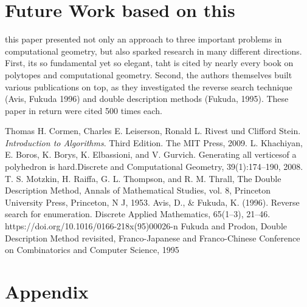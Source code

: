 \documentclass[a4paper, 11pt]{article}
\begin{document}
\section{Future Work based on this }

this paper presented not only an approach to three important problems in computational geometry, but also sparked research in many different directions. First, its so fundamental yet so elegant, taht is cited by nearly every book on polytopes and computational geometry. Second, the authors themselves built various publications on top, as they investigated the reverse search technique (Avis, Fukuda 1996)\cite{AvisReverseSearch} and double description methods (Fukuda, 1995)\cite{FukudaDoubleDescr}. These paper in return were cited 500 times each. \\
 


\newpage

\begin{thebibliography}{9}
	Thomas H. Cormen, Charles E. Leiserson, Ronald L. Rivest und Clifford Stein.
	\textit{Introduction to Algorithms}. Third Edition. The MIT Press, 2009.
	L. Khachiyan, E. Boros, K. Borys, K. Elbassioni, and V. Gurvich. Generating all
	verticesof a polyhedron is hard.Discrete and Computational Geometry,
	39(1):174–190, 2008.
	T. S. Motzkin, H. Raiffa, G. L. Thompson, and R. M. Thrall, The Double Description Method,
	Annals of Mathematical Studies, vol. 8, Princeton University Press, Princeton, N J, 1953.
	Avis, D., \& Fukuda, K. (1996). Reverse search for enumeration. Discrete Applied Mathematics, 65(1–3), 21–46. https://doi.org/10.1016/0166-218x(95)00026-n
	Fukuda and Prodon, Double Description Method revisited,  Franco-Japanese and Franco-Chinese Conference on Combinatorics and Computer Science, 1995
\end{thebibliography}

\newpage

\section{Appendix}
\end{document}
